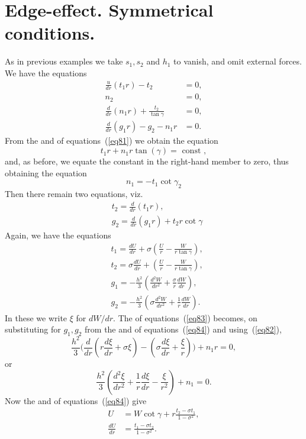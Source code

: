\section{Edge-effect. Symmetrical conditions.}\label{article345}
As in previous examples we take \(s_1, s_2\) and \(h_1\) to vanish, and
omit external forces. We have the equations
\begin{align}
\frac{u}{d r}\left(t_1 r\right)-t_2&=0, \nonumber \\
n_2&=0, \nonumber \\
\frac{d}{d r}\left(n_1 r\right)+\frac{t_2}{\tan \gamma}&=0,\label{eq81} \\
\frac{d}{d r}\left(g_1 r\right)-g_2-n_1 r&=0 \nonumber .
\end{align}
From the  and  of equations~(\ref{eq81}) we obtain the equation
\[t_1 r+n_1 r \tan(\gamma)=\text { const },\]
and, as before, we equate the constant in the right-hand member to zero,
thus obtaining the equation
\begin{equation}\label{eq82} n_1=-t_1 \cot \gamma_2 \end{equation}
Then there remain two equations, viz.
\begin{align}
& t_2=\frac{d}{d r}\left(t_1 r\right), \nonumber \\
& g_2=\frac{d}{d r}\left(g_1 r\right)+t_2 r \cot \gamma \label{eq83}
\end{align}
Again, we have the equations
\begin{align}
& t_1=\frac{d U}{d r}+\sigma\left(\frac{U}{r}-\frac{W}{r \tan \gamma}\right),\nonumber \\
& t_2=\sigma \frac{d U}{d r}+\left(\frac{U}{r}-\frac{W}{r \tan \gamma}\right),\nonumber \\
& g_1=-\frac{h^2}{3}\left(\frac{d^2 W}{d r^2}+\frac{\sigma}{r} \frac{d W}{d r}\right),\label{eq84} \\
& g_2=-\frac{h^2}{3}\left(\sigma \frac{d^2 W}{d r^2}+\frac{1}{r} \frac{d W}{d r}\right). \nonumber
\end{align}
In these we write \(\xi \) for \(d W / d r\). The  of equations~(\ref{eq83})
becomes, on substituting for \(g_1, g_2\) from the  and  of
equations~(\ref{eq84}) and using~(\ref{eq82}),
\[
\frac{h^2}{3}\big(\frac{d}{d r}\left(r \frac{d \xi}{d r}+
\sigma \xi \right)-\left(\sigma \frac{d \xi}{d r}+
\frac{\xi}{r}\right)\big)+n_1 r=0,
\]
or
\begin{equation}\label{eq85}
\frac{h^2}{3}\left(\frac{d^2 \xi}{d r^2}+
\frac{1}{r} \frac{d \xi}{d r}-\frac{\xi}{r^2}\right)+n_1=0.
\end{equation}
Now the  and  of equations~(\ref{eq84}) give
\begin{align*}
U & =W \cot \gamma+r \frac{t_2-\sigma t_1}{1-\sigma^2}, \\
\frac{d U}{d r} & =\frac{t_1-\sigma t_2}{1-\sigma^2}.
\end{align*}

